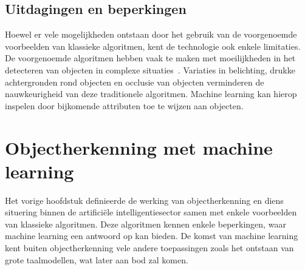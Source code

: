 \subsection{Uitdagingen en beperkingen}
\label{subsec:uitdagingen-en-beperkingen}
Hoewel er vele mogelijkheden ontstaan door het gebruik van de voorgenoemde voorbeelden van klassieke algoritmen, kent de technologie ook enkele limitaties.
De voorgenoemde algoritmen hebben vaak te maken met moeilijkheden in het detecteren van objecten in complexe situaties~\autocite{Luz2024}.
Variaties in belichting, drukke achtergronden rond objecten en occlusie van objecten verminderen de nauwkeurigheid van deze traditionele algoritmen.
Machine learning kan hierop inspelen door bijkomende attributen toe te wijzen aan objecten.

\section{Objectherkenning met machine learning}\label{sec:datasets}
Het vorige hoofdstuk definieerde de werking van objectherkenning en diens situering binnen de artifici\"ele intelligentiesector samen met enkele voorbeelden van klassieke algoritmen.
Deze algoritmen kennen enkele beperkingen, waar machine learning een antwoord op kan bieden.
De komst van machine learning kent buiten objectherkenning vele andere toepassingen zoals het ontstaan van grote taalmodellen, wat later aan bod zal komen.


